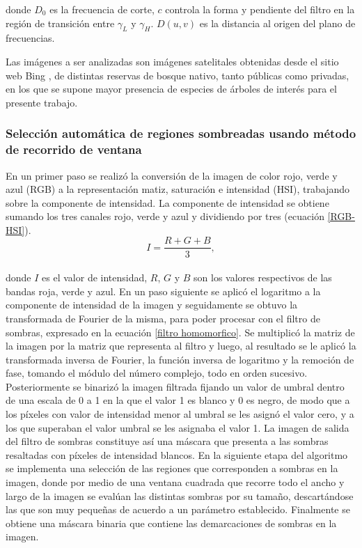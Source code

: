 donde $D_0$ es la frecuencia de corte, $c$ controla la forma y pendiente del filtro en la región de transición entre $\gamma_L$ y $\gamma_H$. $D(u,v)$ es la distancia al origen del plano de frecuencias.

Las imágenes a ser analizadas son imágenes satelitales obtenidas desde el sitio web Bing \cite{noauthor_mapas_nodate}, de distintas reservas de bosque nativo, tanto públicas como privadas, %
en los que se supone mayor presencia de especies de árboles de interés para el presente trabajo. 
\subsubsection{Selección automática de regiones sombreadas usando método de recorrido de ventana} \label{metod_homo_ventana}
En un primer paso se realizó la conversión de la imagen de color rojo, verde y azul (RGB) a la representación matiz, saturación e intensidad (HSI), trabajando sobre la componente de intensidad. La componente de intensidad se obtiene sumando los tres canales rojo, verde y azul y dividiendo por tres (ecuación \ref{RGB-HSI}). 
\\
\begin{equation}
	I=\frac{R+G+B}{3},\label{RGB-HSI}
\end{equation}
\\
donde $I$ es el valor de intensidad, $R$, $G$ y $B$ son los valores respectivos de las bandas roja, verde y azul.
En un paso siguiente se aplicó el logaritmo a la componente de intensidad de la imagen y seguidamente se obtuvo la transformada de Fourier de la misma, para poder procesar con el filtro de sombras, expresado en la ecuación \ref{filtro homomorfico}. Se multiplicó la matriz de la imagen por la matriz que representa al filtro y luego, al resultado se le aplicó la transformada inversa de Fourier, la función inversa de logaritmo y la remoción de fase, tomando el módulo del número complejo, todo en orden sucesivo. 
Posteriormente se binarizó la imagen filtrada fijando un valor de umbral dentro de una escala de 0 a 1 en la que el valor 1 es blanco y 0 es negro, de modo que a los píxeles con valor de intensidad menor al umbral se les asignó el valor cero, y a los que superaban el valor umbral se les asignaba el valor 1. La imagen de salida del filtro de sombras constituye así una máscara que presenta a las sombras resaltadas con píxeles de intensidad blancos. En la siguiente etapa del algoritmo se implementa una selección de las regiones que corresponden a sombras en la imagen, donde por medio de una ventana cuadrada que recorre todo el ancho y largo de la imagen se evalúan las distintas sombras por su tamaño, descartándose las que son muy pequeñas de acuerdo a un parámetro establecido. Finalmente se obtiene una máscara binaria que contiene las demarcaciones de sombras en la imagen.

